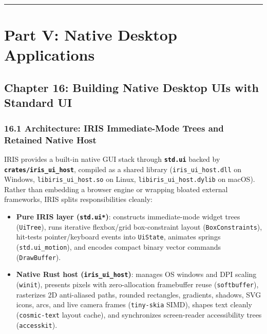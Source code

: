 \documentclass[
  english,
  oneside]{book}
\providecommand{\tightlist}{%
  \setlength{\itemsep}{0pt}\setlength{\parskip}{0pt}}
\begin{document}
\begin{center}\rule{0.5\linewidth}{0.5pt}\end{center}

\part{Part V: Native Desktop
Applications}\label{part-v-native-desktop-applications}

\chapter{Chapter 16: Building Native Desktop UIs with Standard
UI}\label{chapter-16-building-native-desktop-uis-with-standard-ui}

\section{16.1 Architecture: IRIS Immediate-Mode Trees and Retained
Native
Host}\label{architecture-iris-immediate-mode-trees-and-retained-native-host}

IRIS provides a built-in native GUI stack through
\textbf{\texttt{std.ui}} backed by
\textbf{\texttt{crates/iris\_ui\_host}}, compiled as a shared library
(\texttt{iris\_ui\_host.dll} on Windows, \texttt{libiris\_ui\_host.so}
on Linux, \texttt{libiris\_ui\_host.dylib} on macOS). Rather than
embedding a browser engine or wrapping bloated external frameworks, IRIS
splits responsibilities cleanly:

\begin{itemize}
\tightlist
\item
  \textbf{Pure IRIS layer (\texttt{std.ui*})}: constructs immediate-mode
  widget trees (\texttt{UiTree}), runs iterative flexbox/grid
  box-constraint layout (\texttt{BoxConstraints}), hit-tests
  pointer/keyboard events into \texttt{UiState}, animates springs
  (\texttt{std.ui\_motion}), and encodes compact binary vector commands
  (\texttt{DrawBuffer}).
\item
  \textbf{Native Rust host (\texttt{iris\_ui\_host})}: manages OS
  windows and DPI scaling (\texttt{winit}), presents pixels with
  zero-allocation framebuffer reuse (\texttt{softbuffer}), rasterizes 2D
  anti-aliased paths, rounded rectangles, gradients, shadows, SVG icons,
  arcs, and live camera frames (\texttt{tiny-skia} SIMD), shapes text
  cleanly (\texttt{cosmic-text} layout cache), and synchronizes
  screen-reader accessibility trees (\texttt{accesskit}).
\end{itemize}
\end{document}
